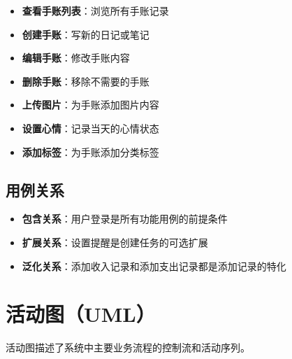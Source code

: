 \documentclass[a4paper]{article}
\begin{document}
\begin{itemize}
    \item \textbf{查看手账列表}：浏览所有手账记录
    \item \textbf{创建手账}：写新的日记或笔记
    \item \textbf{编辑手账}：修改手账内容
    \item \textbf{删除手账}：移除不需要的手账
    \item \textbf{上传图片}：为手账添加图片内容
    \item \textbf{设置心情}：记录当天的心情状态
    \item \textbf{添加标签}：为手账添加分类标签
\end{itemize}

\subsection{用例关系}

\begin{itemize}
    \item \textbf{包含关系}：用户登录是所有功能用例的前提条件
    \item \textbf{扩展关系}：设置提醒是创建任务的可选扩展
    \item \textbf{泛化关系}：添加收入记录和添加支出记录都是添加记录的特化
\end{itemize}

\section{活动图（UML）}

活动图描述了系统中主要业务流程的控制流和活动序列。
\end{document}
